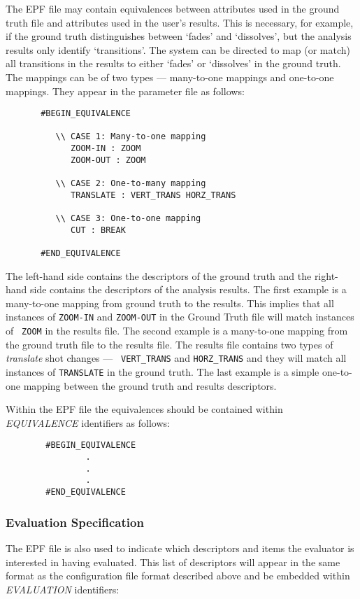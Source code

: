 The EPF file may contain equivalences
between attributes used in the ground truth file and attributes used
in the user's results. This is necessary, for example, if the ground
truth distinguishes between `fades' and `dissolves', but the analysis
results only identify `transitions'. The system can be directed to map
(or match) all transitions in the results to either `fades' or
`dissolves' in the ground truth. The mappings can be of two types ---
many-to-one mappings and one-to-one mappings. They appear in the
parameter file as follows:

\begin{verbatim}
       #BEGIN_EQUIVALENCE

          \\ CASE 1: Many-to-one mapping
             ZOOM-IN : ZOOM
             ZOOM-OUT : ZOOM

          \\ CASE 2: One-to-many mapping
             TRANSLATE : VERT_TRANS HORZ_TRANS

          \\ CASE 3: One-to-one mapping
             CUT : BREAK

       #END_EQUIVALENCE
\end{verbatim}

The left-hand side contains the descriptors of the ground truth and
the right-hand side contains the descriptors of the analysis
results. The first example is a many-to-one mapping from ground truth
to the results. This implies that all instances of {\tt ZOOM-IN} and
{\tt ZOOM-OUT} in the Ground Truth file will match instances of {\tt
ZOOM} in the results file. The second example is a many-to-one mapping
from the ground truth file to the results file.  The results file
contains two types of {\em translate} shot changes --- {\tt
VERT\_TRANS} and {\tt HORZ\_TRANS} and they will match all instances
of {\tt TRANSLATE} in the ground truth.  The last example is a simple
one-to-one mapping between the ground truth and results descriptors.

Within the EPF file the equivalences should be contained within {\em
EQUIVALENCE} identifiers as follows:
\begin{verbatim}
        #BEGIN_EQUIVALENCE
                .       
                .
                .
        #END_EQUIVALENCE
\end{verbatim}


\subsubsection{Evaluation Specification}
The EPF file is also used to indicate which descriptors and items the
evaluator is interested in having evaluated.  
 This list of
descriptors will appear in the same format as the configuration file
format described above and be embedded within {\em EVALUATION}
identifiers:

